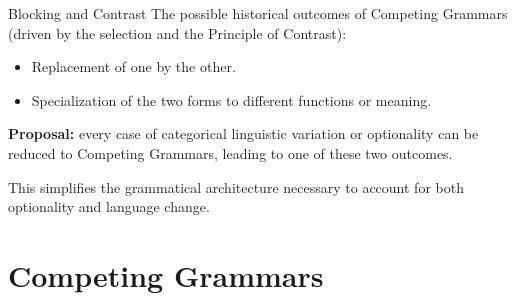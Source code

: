 \documentclass[hyperref={pdfpagelabels=false}]{beamer}
\begin{document}
\begin{frame}{Blocking and Contrast}
	The possible historical outcomes of Competing Grammars (driven by the selection and the Principle of Contrast):
	\begin{itemize} 
		\item Replacement of one by the other.
		\item Specialization of the two forms to different functions or meaning.
	\end{itemize}

	\textbf{Proposal:} every case of categorical linguistic variation or optionality can be reduced to Competing Grammars, leading to one of these two outcomes.
	
	This simplifies the grammatical architecture necessary to account for both optionality and language change.
\end{frame}



%
%
%
\section{Competing Grammars}
\end{document}
